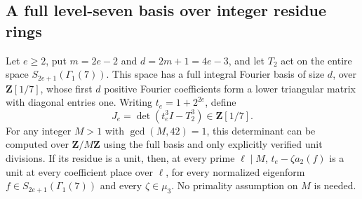 \subsection{A full level-seven basis over integer residue rings}
\label{sec:gl2-minus7-generic}

\begin{proposition}
\label{prop:minus7-gl2-generic}
Let \(e\ge2\), put \(m=2e-2\) and \(d=2m+1=4e-3\), and let
\(T_2\) act on the entire space \(S_{2e+1}(\Gamma_1(7))\).
This space has a full integral Fourier basis of size \(d\), over
\(\mathbf Z[1/7]\), whose first \(d\) positive Fourier coefficients
form a lower triangular matrix with diagonal entries one.
Writing \(t_e=1+2^{2e}\), define
\[
 J_e=\det(t_e^3I-T_2^3)\in\mathbf Z[1/7].
 \tag{G7G.1}
\]
For any integer \(M>1\) with \(\gcd(M,42)=1\), this determinant
can be computed over \(\mathbf Z/M\mathbf Z\) using the full
basis and only explicitly verified unit divisions.
If its residue is a unit, then, at every prime \(\ell\mid M\),
\(t_e-\zeta a_2(f)\) is a unit at every coefficient place over
\(\ell\), for every normalized eigenform
\(f\in S_{2e+1}(\Gamma_1(7))\) and every \(\zeta\in\mu_3\).
No primality assumption on \(M\) is needed.
\end{proposition}

